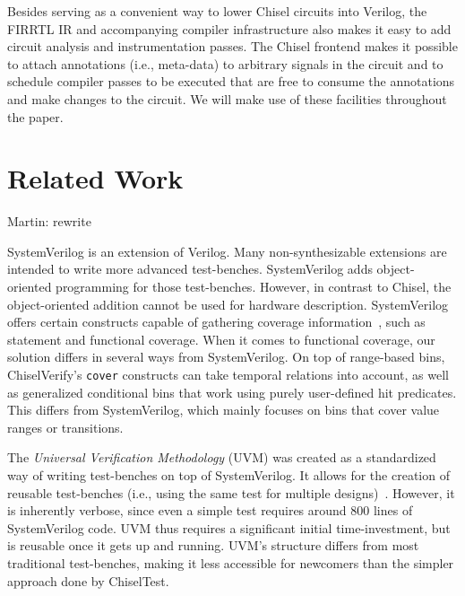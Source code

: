 \documentclass[conference]{IEEEtran}
\newcommand{\todo}[1]{{\color{olive} TODO: #1}}
\newcommand{\martin}[1]{{\color{blue} Martin: #1}}
\begin{document}
Besides serving as a convenient way to lower Chisel circuits into Verilog, the FIRRTL IR and accompanying compiler infrastructure
also makes it easy to add circuit analysis and instrumentation passes.
The Chisel frontend makes it possible to attach annotations (i.e., meta-data) to arbitrary signals in the circuit and to schedule compiler passes
to be executed that are free to consume the annotations and make changes to the circuit.
We will make use of these facilities throughout the paper.



\section{Related Work}

\martin{rewrite}


SystemVerilog is an extension of Verilog. Many non-synthesizable extensions are intended
to write more advanced test-benches. SystemVerilog adds object-oriented programming
for those test-benches. However, in contrast to Chisel, the object-oriented addition cannot be
used for hardware description.
SystemVerilog offers certain constructs capable of gathering coverage information~\cite{spear2008systemverilog}, such as statement and functional coverage. 
When it comes to functional coverage, our solution differs in several ways from SystemVerilog. 
On top of range-based bins, ChiselVerify's \texttt{cover} constructs can take temporal relations into account, as well as generalized conditional bins that work using purely user-defined hit predicates.
This differs from SystemVerilog, which mainly focuses on bins that cover value ranges or transitions. 

The \textit{Universal Verification Methodology} (UVM) was created as a standardized way of writing test-benches on top of SystemVerilog. 
It allows for the creation of reusable test-benches (i.e., using the same test for multiple designs)~\cite{uvm2015}. 
However, it is inherently verbose, since even a simple test requires around 800 lines of SystemVerilog code. 
UVM thus requires a significant initial time-investment, but is reusable once it gets up and running. 
UVM's structure differs from most traditional test-benches, making it less accessible for newcomers than the simpler approach done by ChiselTest.
\end{document}
